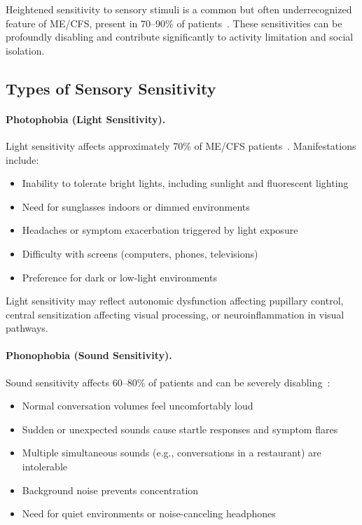 Heightened sensitivity to sensory stimuli is a common but often underrecognized feature of ME/CFS, present in 70--90\% of patients~\cite{Jason2013sensory}. These sensitivities can be profoundly disabling and contribute significantly to activity limitation and social isolation.

\subsection{Types of Sensory Sensitivity}
\label{subsec:sensory-types}

\paragraph{Photophobia (Light Sensitivity).}
Light sensitivity affects approximately 70\% of ME/CFS patients~\cite{Jason2013sensory}. Manifestations include:
\begin{itemize}
    \item Inability to tolerate bright lights, including sunlight and fluorescent lighting
    \item Need for sunglasses indoors or dimmed environments
    \item Headaches or symptom exacerbation triggered by light exposure
    \item Difficulty with screens (computers, phones, televisions)
    \item Preference for dark or low-light environments
\end{itemize}

Light sensitivity may reflect autonomic dysfunction affecting pupillary control, central sensitization affecting visual processing, or neuroinflammation in visual pathways.

\paragraph{Phonophobia (Sound Sensitivity).}
Sound sensitivity affects 60--80\% of patients and can be severely disabling~\cite{Jason2013sensory}:
\begin{itemize}
    \item Normal conversation volumes feel uncomfortably loud
    \item Sudden or unexpected sounds cause startle responses and symptom flares
    \item Multiple simultaneous sounds (e.g., conversations in a restaurant) are intolerable
    \item Background noise prevents concentration
    \item Need for quiet environments or noise-canceling headphones
\end{itemize}

